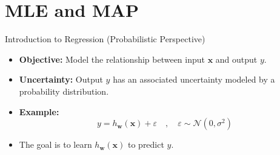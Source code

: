 \documentclass[serif, aspectratio=169]{beamer}
\begin{document}

\section{MLE and MAP}
\begin{frame}{Introduction to Regression (Probabilistic Perspective)}
    \begin{itemize}
        \item \textbf{Objective:} Model the relationship between input \( \mathbf{x} \) and output \( y \).
        \item \textbf{Uncertainty:} Output \( y \) has an associated uncertainty modeled by a probability distribution.
        \item \textbf{Example:}
        \[
        y = h_{\mathbf{w}}(\mathbf{x} ) + \varepsilon \quad , \quad \varepsilon \sim \mathcal{N}(0, \sigma^2)
        \]
        \item The goal is to learn \( h_{\mathbf{w}}(\mathbf{x} ) \) to predict \( y \).
    \end{itemize}
\end{frame}
\end{document}

